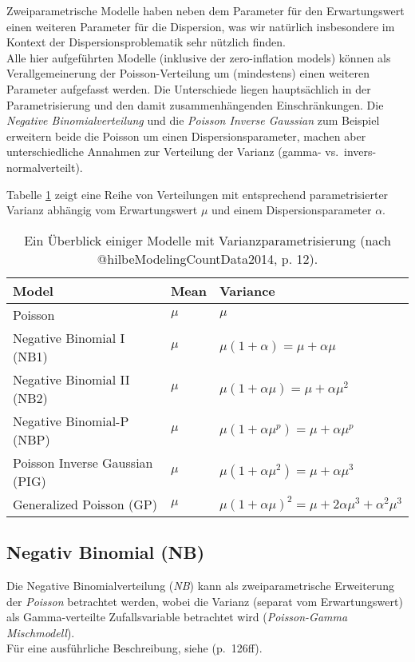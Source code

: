 \documentclass[ngerman,a4paper,]{scrartcl}
\theoremstyle{definition}
\theoremstyle{definition}
\theoremstyle{definition}
\theoremstyle{remark}
\begin{document}
Zweiparametrische Modelle haben neben dem Parameter für den Erwartungswert einen weiteren Parameter für die Dispersion, was wir natürlich insbesondere im Kontext der Dispersionsproblematik sehr nützlich finden.\\
Alle hier aufgeführten Modelle (inklusive der zero-inflation models) können als Verallgemeinerung der Poisson-Verteilung um (mindestens) einen weiteren Parameter aufgefasst werden. Die Unterschiede liegen hauptsächlich in der Parametrisierung und den damit zusammenhängenden Einschränkungen. Die \emph{Negative Binomialverteilung} und die \emph{Poisson Inverse Gaussian} zum Beispiel erweitern beide die Poisson um einen Dispersionsparameter, machen aber unterschiedliche Annahmen zur Verteilung der Varianz (gamma- vs.~invers-normalverteilt).

Tabelle \ref{tab:modelstable} zeigt eine Reihe von Verteilungen mit entsprechend parametrisierter Varianz abhängig vom Erwartungswert \(\mu\) und einem Dispersionsparameter \(\alpha\).

\begin{table}

\caption{\label{tab:modelstable} Ein Überblick einiger Modelle mit Varianzparametrisierung (nach @hilbeModelingCountData2014, p. 12).}
\centering
\begin{tabular}[t]{lll}
\toprule
Model & Mean & Variance\\
\midrule
Poisson & $\mu$ & $\mu$\\
Negative Binomial I (NB1) & $\mu$ & $\mu (1 + \alpha) = \mu + \alpha\mu$\\
Negative Binomial II (NB2) & $\mu$ & $\mu (1 + \alpha\mu) = \mu + \alpha\mu^2$\\
Negative Binomial-P (NBP) & $\mu$ & $\mu (1 + \alpha\mu^p) = \mu + \alpha\mu^p$\\
Poisson Inverse Gaussian (PIG) & $\mu$ & $\mu (1 + \alpha\mu^2) = \mu + \alpha\mu^3$\\
Generalized Poisson (GP) & $\mu$ & $\mu (1 + \alpha\mu)^2 = \mu + 2\alpha\mu^3 + \alpha^2\mu^3$\\
\bottomrule
\end{tabular}
\end{table}

\hypertarget{mod-nb}{%
\subsection{Negativ Binomial (NB)}\label{mod-nb}}

Die Negative Binomialverteilung (\emph{NB}) kann als zweiparametrische Erweiterung der \emph{Poisson} betrachtet werden, wobei die Varianz (separat vom Erwartungswert) als Gamma-verteilte Zufallsvariable betrachtet wird (\emph{Poisson-Gamma Mischmodell}).\\
Für eine ausführliche Beschreibung, siehe \citet{hilbeModelingCountData2014} (p.~126ff).
\end{document}
